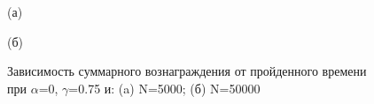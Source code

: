 \documentclass[a4paper]{report}
\theoremstyle{definition}
\theoremstyle{plain}
\theoremstyle{remark}
\theoremstyle{remark}
\theoremstyle{definition}
\begin{document}
\begin{figure}[H]
    \begin{minipage}[H]{0.49\linewidth}
        (а)\\
    \end{minipage}
    \hfill
    \begin{minipage}[H]{0.49\linewidth}
        (б)\\
    \end{minipage}
    \caption{Зависимость суммарного вознаграждения от пройденного времени при $\alpha$=0, $\gamma$=0.75 и: (a) N=5000; (б) N=50000}
\end{figure}
\end{document}
